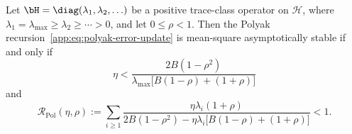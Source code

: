 \begin{theorem}
\label{app:thm:polyak-stability}
Let $\bH=\diag(\lambda_1,\lambda_2,\ldots)$ be a positive trace-class operator on $\mathcal H$, where
\(\lambda_1=\lambda_{\max}\geq\lambda_2\geq\cdots>0\), and let \(0\leq\rho<1\). Then the Polyak recursion~\eqref{app:eq:polyak-error-update} is mean-square asymptotically stable if and only if
\begin{equation}
\label{app:eq:polyak-local-condition}
\eta
<
\frac{2B(1-\rho^2)}
{\lambda_{\max}\big[B(1-\rho)+(1+\rho)\big]}
\end{equation}
and
\begin{equation}
\label{app:eq:polyak-global-condition}
\mathcal R_{\mathrm{Pol}}(\eta,\rho)
:=
\sum_{i\geq1}
\frac{\eta\lambda_i(1+\rho)}
{2B(1-\rho^2)-\eta\lambda_i\big[B(1-\rho)+(1+\rho)\big]}
<1.
\end{equation}
\end{theorem}

